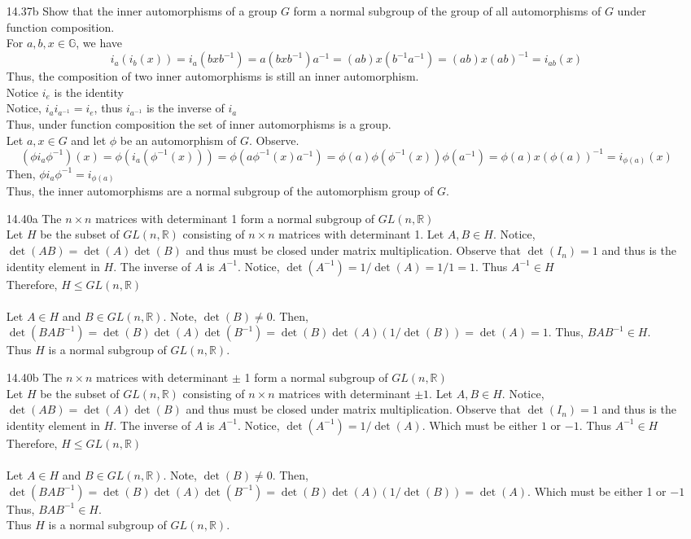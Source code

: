 \documentclass[12pt]{article}
\newcommand{\R}{\mathbb{R}}
\newcommand{\G}{\mathbb{G}}
\begin{document}
\begin{enumerate}
	\item[14.37b] Show that the inner automorphisms of a group $ G $ form a normal subgroup of the group of all automorphisms of $ G $ under function composition.\\
	For $ a,b,x\in\G $, we have \[i_a(i_b(x))=i_a(bxb^{-1})=a(bxb^{-1})a^{-1}=(ab)x(b^{-1}a^{-1})=(ab)x(ab)^{-1}=i_{ab}(x)\]
	Thus, the composition of two inner automorphisms is still an inner automorphism.\\
	Notice $ i_e $ is the identity\\
	Notice, $ i_ai_{a^{-1}} =i_e$, thus $ i_{a^{-1}} $ is the inverse of $ i_a $\\
	Thus, under function composition the set of inner automorphisms is a group.\\
	Let $ a,x\in G $ and let $ \phi $ be an automorphism of $ G $. Observe. 
	 \[(\phi i_a\phi^{-1})(x)=\phi(i_a(\phi^{-1}(x)))=\phi(a\phi^{-1}(x)a^{-1})=\phi(a)\phi(\phi^{-1}(x))\phi(a^{-1})=\phi(a)x(\phi(a))^{-1}=i_{\phi(a)}(x)\]
	 Then, $\phi i_a\phi^{-1}=i_{\phi(a)}$\\
	 Thus, the inner automorphisms are a normal subgroup of the automorphism group of $ G $.
	\item[14.40a]The $ n \times n$ matrices with determinant 1 form a normal subgroup of $GL(n,\R) $\\
	Let $ H $ be the subset of $ GL(n,\R) $ consisting of $ n\times n $ matrices with determinant 1. Let $ A,B\in H $. Notice, $ \det(AB) = \det(A)\det(B)$ and thus must be closed under matrix multiplication. Observe that $ \det(I_n) = 1 $ and thus is the identity element in $ H $. The inverse of $ A $ is $ A^{-1} $. Notice, $ \det(A^{-1}) = 1/\det(A)=1/1=1 $. Thus $ A^{-1}\in H $ \\
	Therefore, $ H \leq GL(n,\R) $\\
	\\
	Let $ A\in H $ and $ B\in GL(n,\R) $. Note, $ \det(B)\not= 0 $. Then, $ \det(BAB^{-1}) = \det(B)\det(A)\det(B^{-1})=\det(B)\det(A)(1/\det(B))=\det(A)=1 $. Thus, $ BAB^{-1}\in H $.\\
	Thus $ H $ is a normal subgroup of $ GL(n,\R) $.
	
	\item[14.40b] The $ n \times n$ matrices with determinant $ \pm $ 1 form a normal subgroup of $GL(n,\R) $\\
		Let $ H $ be the subset of $ GL(n,\R) $ consisting of $ n\times n $ matrices with determinant $ \pm 1 $. Let $ A,B\in H $. Notice, $ \det(AB) = \det(A)\det(B)$ and thus must be closed under matrix multiplication. Observe that $ \det(I_n) = 1 $ and thus is the identity element in $ H $. The inverse of $ A $ is $ A^{-1} $. Notice, $ \det(A^{-1}) = 1/\det(A)$. Which must be either $ 1 $ or $ -1 $. Thus $ A^{-1}\in H $ \\
	Therefore, $ H \leq GL(n,\R) $\\
	\\
	Let $ A\in H $ and $ B\in GL(n,\R) $. Note, $ \det(B)\not= 0 $. Then, $ \det(BAB^{-1}) = \det(B)\det(A)\det(B^{-1})=\det(B)\det(A)(1/\det(B))=\det(A) $. Which must be either 1 or $ -1 $ Thus, $ BAB^{-1}\in H $.\\
Thus $ H $ is a normal subgroup of $ GL(n,\R) $.
\end{enumerate}
\end{document}
